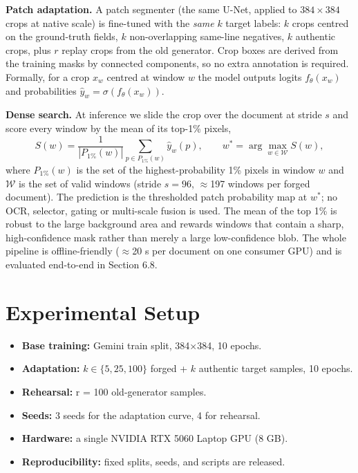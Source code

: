 \documentclass[preprint,12pt]{elsarticle}
\providecommand{\tightlist}{} %
\begin{document}
\textbf{Patch adaptation.} A patch segmenter (the same U-Net, applied to $384\times384$ crops at native scale) is fine-tuned with the \emph{same} $k$ target labels: $k$ crops centred on the ground-truth fields, $k$ non-overlapping same-line negatives, $k$ authentic crops, plus $r$ replay crops from the old generator. Crop boxes are derived from the training masks by connected components, so no extra annotation is required. Formally, for a crop $x_w$ centred at window $w$ the model outputs logits $f_\theta(x_w)$ and probabilities $\hat{y}_w=\sigma(f_\theta(x_w))$.

\textbf{Dense search.} At inference we slide the crop over the document at stride $s$ and score every window by the mean of its top-1\% pixels,
\begin{equation*}
S(w) = \frac{1}{|P_{1\%}(w)|}\sum_{p\in P_{1\%}(w)} \hat{y}_w(p),
\qquad
w^* = \arg\max_{w\in\mathcal{W}} S(w),
\end{equation*}
where $P_{1\%}(w)$ is the set of the highest-probability 1\% pixels in window $w$ and $\mathcal{W}$ is the set of valid windows (stride $s=96$, $\approx$197 windows per forged document). The prediction is the thresholded patch probability map at $w^*$; no OCR, selector, gating or multi-scale fusion is used. The mean of the top 1\% is robust to the large background area and rewards windows that contain a sharp, high-confidence mask rather than merely a large low-confidence blob. The whole pipeline is offline-friendly ($\approx$20 s per document on one consumer GPU) and is evaluated end-to-end in Section 6.8.

\bigskip

\section{Experimental Setup}\label{experimental-setup}

\begin{itemize}
\tightlist
\item
  \textbf{Base training:} Gemini train split, 384×384, 10 epochs.
\item
  \textbf{Adaptation:} $k\in\{5,25,100\}$ forged + $k$ authentic target samples, 10 epochs.
\item
  \textbf{Rehearsal:} r = 100 old-generator samples.
\item
  \textbf{Seeds:} 3 seeds for the adaptation curve, 4 for rehearsal.
\item
  \textbf{Hardware:} a single NVIDIA RTX 5060 Laptop GPU (8 GB).
\item
  \textbf{Reproducibility:} fixed splits, seeds, and scripts are released.
\end{itemize}
\end{document}
